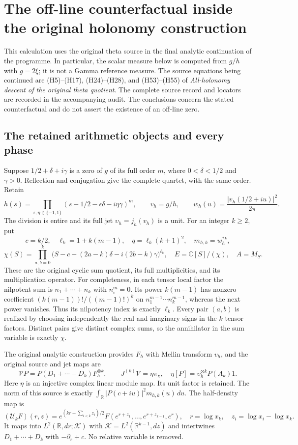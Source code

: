 \section{The off-line counterfactual inside the original holonomy construction}

This calculation uses the original theta source in the final analytic
continuation of the programme.  In particular, the scalar measure below is
computed from $g/h$ with $g=2\xi$; it is not a Gamma reference measure.
The source equations being continued are (H5)--(H17), (H24)--(H28), and
(H53)--(H55) of \emph{All-holonomy descent of the original theta quotient}.
The complete source record and locators are recorded in the accompanying
audit.  The conclusions concern the stated counterfactual and do not assert
the existence of an off-line zero.

\subsection{The retained arithmetic objects and every phase}

Suppose $1/2+\delta+i\gamma$ is a zero of $g$ of its full order $m$, where
$0<\delta<1/2$ and $\gamma>0$.  Reflection and conjugation give the complete
quartet, with the same order.  Retain
\[
 h(s)=\prod_{\epsilon,\eta\in\{-1,1\}}
 (s-1/2-\epsilon\delta-i\eta\gamma)^m,
 \qquad v_h=g/h,
 \qquad w_h(u)=\frac{|v_h(1/2+iu)|^2}{2\pi}.
 \tag{HT1}
\]
The division is entire and its full jet $\upsilon_h=j_h(v_h)$ is a unit.
For an integer $k\geq2$, put
\[
 c=k/2,\quad \ell_k=1+k(m-1),\quad q=\ell_k(k+1)^2,
 \quad m_{h,k}=w_h^{*k},
\]
\[
 \chi(S)=\prod_{a,b=0}^{k}
 \bigl(S-c-(2a-k)\delta-i(2b-k)\gamma\bigr)^{\ell_k},
 \quad E=\mathbb C[S]/(\chi),\quad A=M_S.
 \tag{HT2}
\]
These are the original cyclic sum quotient, its full multiplicities, and
its multiplication operator.  For completeness, in each tensor local
factor the nilpotent sum is $n_1+\cdots+n_k$ with $n_i^m=0$.
Its power $k(m-1)$ has nonzero coefficient
$(k(m-1))!/((m-1)!)^k$ on $n_1^{m-1}\cdots n_k^{m-1}$, whereas the next
power vanishes.  Thus its nilpotency index is exactly $\ell_k$.
Every pair $(a,b)$ is realized by choosing independently the real and
imaginary signs in the $k$ tensor factors.  Distinct pairs give distinct
complex sums, so the annihilator in the sum variable is exactly $\chi$.

The original analytic construction provides $F_h$ with Mellin transform
$v_h$, and the original source and jet maps are
\[
 \mathcal VP=P(D_1+\cdots+D_k)F_h^{\otimes k},\qquad
 J^{(k)}\mathcal V=\eta\pi_\chi,
 \quad \eta[P]=\upsilon_h^{\otimes k}P(A_k)1.
 \tag{HT3}
\]
Here $\eta$ is an injective complex linear module map.  Its unit factor is
retained.  The norm of this source is exactly
$\int_{\mathbb R}|P(c+iu)|^2m_{h,k}(u)\,du$.
The half-density map is
\[
 (\mathcal U_k F)(r,z)=e^{(kr+\sum_{i<k}z_i)/2}
 F(e^{r+z_1},\ldots,e^{r+z_{k-1}},e^r),
 \quad r=\log x_k,\quad z_i=\log x_i-\log x_k.
 \tag{HT4}
\]
It maps into $L^2(\mathbb R,dr;\mathcal K)$ with
$\mathcal K=L^2(\mathbb R^{k-1},dz)$ and intertwines $D_1+\cdots+D_k$
with $-\partial_r+c$.  No relative variable is removed.

